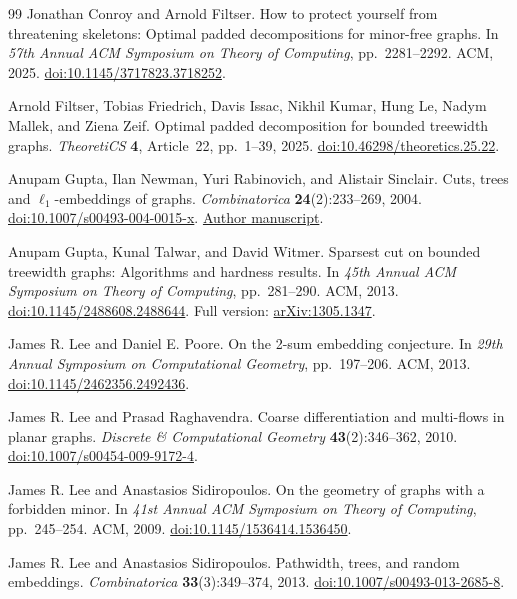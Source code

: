 \begin{thebibliography}{99}
Jonathan Conroy and Arnold Filtser.
How to protect yourself from threatening skeletons:
Optimal padded decompositions for minor-free graphs.
In \emph{57th Annual ACM Symposium on Theory of Computing},
pp.~2281--2292. ACM, 2025.
\href{https://doi.org/10.1145/3717823.3718252}{doi:10.1145/3717823.3718252}.

Arnold Filtser, Tobias Friedrich, Davis Issac, Nikhil Kumar, Hung Le,
Nadym Mallek, and Ziena Zeif.
Optimal padded decomposition for bounded treewidth graphs.
\emph{TheoretiCS} \textbf{4}, Article~22, pp.~1--39, 2025.
\href{https://doi.org/10.46298/theoretics.25.22}{doi:10.46298/theoretics.25.22}.

Anupam Gupta, Ilan Newman, Yuri Rabinovich, and Alistair Sinclair.
Cuts, trees and $\ell_1$-embeddings of graphs.
\emph{Combinatorica} \textbf{24}(2):233--269, 2004.
\href{https://doi.org/10.1007/s00493-004-0015-x}{doi:10.1007/s00493-004-0015-x}.
\href{https://cs.nyu.edu/~ag10120/papers/focs99.pdf}{Author manuscript}.

Anupam Gupta, Kunal Talwar, and David Witmer.
Sparsest cut on bounded treewidth graphs: Algorithms and hardness results.
In \emph{45th Annual ACM Symposium on Theory of Computing},
pp.~281--290. ACM, 2013.
\href{https://doi.org/10.1145/2488608.2488644}{doi:10.1145/2488608.2488644}.
Full version: \href{https://arxiv.org/abs/1305.1347}{arXiv:1305.1347}.

James R. Lee and Daniel E. Poore.
On the 2-sum embedding conjecture.
In \emph{29th Annual Symposium on Computational Geometry},
pp.~197--206. ACM, 2013.
\href{https://doi.org/10.1145/2462356.2492436}{doi:10.1145/2462356.2492436}.

James R. Lee and Prasad Raghavendra.
Coarse differentiation and multi-flows in planar graphs.
\emph{Discrete \& Computational Geometry} \textbf{43}(2):346--362, 2010.
\href{https://doi.org/10.1007/s00454-009-9172-4}{doi:10.1007/s00454-009-9172-4}.

James R. Lee and Anastasios Sidiropoulos.
On the geometry of graphs with a forbidden minor.
In \emph{41st Annual ACM Symposium on Theory of Computing},
pp.~245--254. ACM, 2009.
\href{https://doi.org/10.1145/1536414.1536450}
{doi:10.1145/1536414.1536450}.

James R. Lee and Anastasios Sidiropoulos.
Pathwidth, trees, and random embeddings.
\emph{Combinatorica} \textbf{33}(3):349--374, 2013.
\href{https://doi.org/10.1007/s00493-013-2685-8}{doi:10.1007/s00493-013-2685-8}.


\end{thebibliography}
